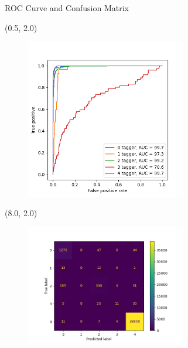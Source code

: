 \documentclass[12pt, xcolor={dvipsnames}, aspectratio = 169]{beamer}
\begin{document}
\begin{frame}{ROC Curve and Confusion Matrix}

\begin{textblock}{7.0}(0.5, 2.0)
\begin{figure}
    \centering
    \includegraphics[width=7.0cm]{../imgs/roc-curve.png}
\end{figure}
\end{textblock}

\begin{textblock}{7.0}(8.0, 2.0)
\begin{figure}
    \centering
    \includegraphics[width=7.0cm]{../imgs/cls-cm.png}
\end{figure}
\end{textblock}

\end{frame}
\end{document}
